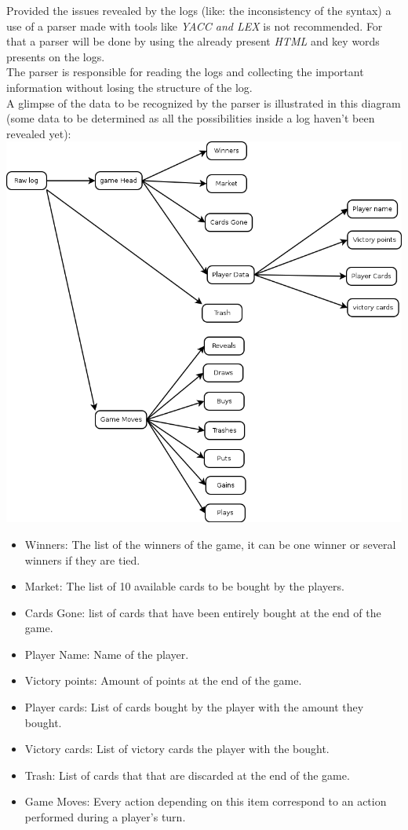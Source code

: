 \documentclass{scrreprt}
\begin{document}
Provided the issues revealed by the logs (like: the inconsistency of the syntax)
a use of a parser made with tools like \textit{YACC and LEX} is not recommended.
For that a parser will be done by using the already present \textit{HTML} and
key words presents on the logs.\\
The parser is responsible for reading the logs and collecting the important
information without losing the structure of the log.\\
A glimpse of the data to be recognized by the parser is illustrated in this
diagram (some data to be determined as all the possibilities inside a log
haven't been revealed yet):\\
\includegraphics[scale=0.35,keepaspectratio]{UseCaseParser}

\begin{itemize}
\item Winners: The list of the winners of the game, it can be one winner or several winners if they are tied.
\item Market: The list of 10 available cards to be bought by the players.
\item Cards Gone: list of cards that have been entirely bought at the end of the game.
\item Player Name: Name of the player.
\item Victory points: Amount of points at the end of the game.
\item Player cards: List of cards bought by the player with the amount they bought.
\item Victory cards: List of victory cards the player with the bought.
\item Trash: List of cards that that are discarded at the end of the game.
\item Game Moves: Every action depending on this item correspond to an action performed during a player's turn.
\end{itemize}
\end{document}
